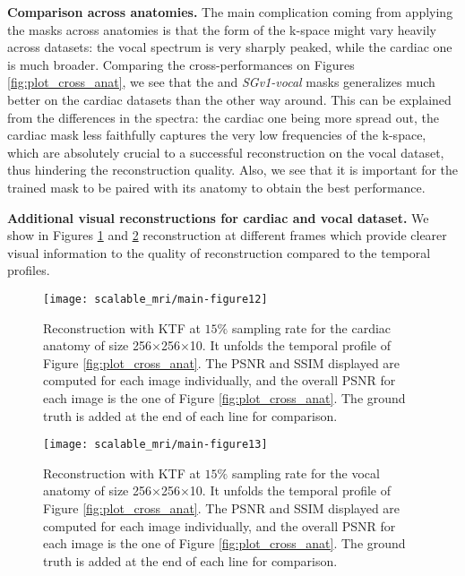 \textbf{Comparison across anatomies.}\label{sec:anatomies} The main complication coming from applying the masks across anatomies is that the form of the k-space might vary heavily across datasets: the vocal spectrum is very sharply peaked, while the cardiac one is much broader.  Comparing the cross-performances on Figures \ref{fig:plot_cross_anat}, we see that the and \textit{SGv1-vocal} masks generalizes much better on the cardiac datasets than the other way around. This can be explained from the differences in the spectra: the cardiac one being more spread out, the cardiac mask less faithfully captures the very low frequencies of the k-space, which are absolutely crucial to a successful reconstruction on the vocal dataset, thus hindering the reconstruction quality. Also, we see that it is important for the trained mask to be paired with its anatomy to obtain the best performance.

\textbf{Additional visual reconstructions for cardiac and vocal dataset.} We show in Figures \ref{fig:cardiac} and \ref{fig:vocal} reconstruction at different frames which provide clearer visual information to the quality of reconstruction compared to the temporal profiles.
\begin{figure}[!ht]
    \centering
	\texttt{[image: scalable\_mri/main-figure12]}
	\caption{Reconstruction with KTF \citep{jung2009k} at $15\%$ sampling rate for the cardiac anatomy of size 256$\times$256$\times$10. It unfolds the temporal profile of Figure \ref{fig:plot_cross_anat}. The PSNR and SSIM displayed are computed for each image individually, and the overall PSNR for each image is the one of Figure \ref{fig:plot_cross_anat}. The ground truth is added at the end of each line for comparison.}\label{fig:cardiac}
\end{figure}
\begin{figure}[!ht]
    \centering
	\texttt{[image: scalable\_mri/main-figure13]}
	\caption{Reconstruction with KTF at $15\%$  \citep{jung2009k} sampling rate for the vocal anatomy of size 256$\times$256$\times$10. It unfolds the temporal profile of Figure \ref{fig:plot_cross_anat}. The PSNR and SSIM displayed are computed for each image individually, and the overall PSNR for each image is the one of Figure \ref{fig:plot_cross_anat}. The ground truth is added at the end of each line for comparison. }\label{fig:vocal}

\end{figure}

